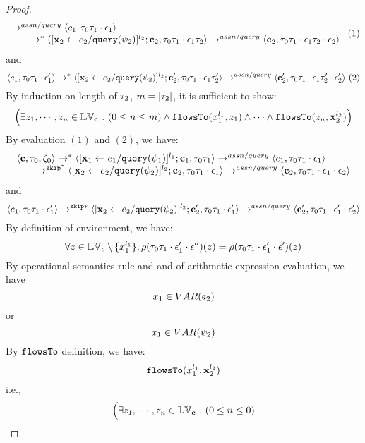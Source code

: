 \begin{proof}
\[\begin{array}{l}
\rightarrow^{assn/query}
 \langle c_1, \mathtt{\tau}_0 \mathtt{\tau}_1 \cdot \mathtt{\epsilon}_1 \rangle \\
  \qquad \rightarrow^{*} 
  \langle [\mathrel{ {\boldsymbol{\mathbf{x}}}_2 \leftarrow e_2 / {\tt query}(\psi_2) }]^{l_2};{\boldsymbol{\mathbf{c}}}_2, 
  \mathtt{\tau}_0 \mathtt{\tau}_1 \cdot \mathtt{\epsilon}_1 \mathtt{\tau}_2 \rangle 
  \rightarrow^{assn/query} 
  \langle {\boldsymbol{\mathbf{c}}}_2,  \mathtt{\tau}_0 \mathtt{\tau}_1 \cdot \mathtt{\epsilon}_1 \mathtt{\tau}_2 \cdot \mathtt{\epsilon}_2 \rangle 
\end{array} ~ (1)
 \]
 and 
  \[
  \langle c_1, \mathtt{\tau}_0 \mathtt{\tau}_1 \cdot \mathtt{\epsilon}_1' \rangle 
  \rightarrow^{*} 
  \langle [\mathrel{ {\boldsymbol{\mathbf{x}}}_2 \leftarrow e_2 / {\tt query}(\psi_2) }]^{l_2} ; {\boldsymbol{\mathbf{c}}}_2', \mathtt{\tau}_0 \mathtt{\tau}_1 \cdot \mathtt{\epsilon}_1 \mathtt{\tau}_2' \rangle 
  \rightarrow^{assn/query} 
  \langle {\boldsymbol{\mathbf{c}}}_2',  \mathtt{\tau}_0 \mathtt{\tau}_1 \cdot \mathtt{\epsilon}_1 \mathtt{\tau}_2' \cdot \mathtt{\epsilon}_2' \rangle 
 ~(2)
 \]
%
By induction on length of $\mathtt{\tau}_2$, $m = |\mathtt{\tau}_2|$, it is sufficient to show:
%
 \[
 \Big( \exists z_1, \cdots, z_n \in \mathbb{LV}_{{\boldsymbol{\mathbf{c}}}} ~.~ (0 \leq n \leq m )
 \land \mathtt{flowsTo}(x_1^{l_1}, z_1) \land \cdots \land \mathtt{flowsTo}(z_n, {\boldsymbol{\mathbf{x}}}_2^{l_2}) \Big)
  \]
 By evaluation $(1)$ and $(2)$, we have:
\[
  \begin{array}{l}   
\langle {\boldsymbol{\mathbf{c}}}, \mathtt{\tau}_0, \mathtt{\zeta}_0 \rangle \rightarrow^{*} 
\langle [\mathrel{ {\boldsymbol{\mathbf{x}}}_1 \leftarrow e_1 / {\tt query}(\psi_1) }]^{l_1} ; {\boldsymbol{\mathbf{c}}}_1, \mathtt{\tau}_0 \mathtt{\tau}_1 \rangle  \rightarrow^{assn/query}
 \langle c_1, \mathtt{\tau}_0 \mathtt{\tau}_1 \cdot \mathtt{\epsilon}_1 \rangle \\
  \qquad \rightarrow^{\mathtt{skip}^*} 
  \langle [\mathrel{ {\boldsymbol{\mathbf{x}}}_2 \leftarrow e_2 / {\tt query}(\psi_2) }]^{l_2};{\boldsymbol{\mathbf{c}}}_2, 
  \mathtt{\tau}_0 \mathtt{\tau}_1 \cdot \mathtt{\epsilon}_1 \rangle 
  \rightarrow^{assn/query} 
  \langle {\boldsymbol{\mathbf{c}}}_2,  \mathtt{\tau}_0 \mathtt{\tau}_1 \cdot \mathtt{\epsilon}_1 \cdot \mathtt{\epsilon}_2 \rangle 
\end{array}
 \]
 and 
  \[
  \langle c_1, \mathtt{\tau}_0 \mathtt{\tau}_1 \cdot \mathtt{\epsilon}_1' \rangle 
  \rightarrow^{\mathtt{skip}*} 
  \langle [\mathrel{ {\boldsymbol{\mathbf{x}}}_2 \leftarrow e_2 / {\tt query}(\psi_2) }]^{l_2} ; {\boldsymbol{\mathbf{c}}}_2', \mathtt{\tau}_0 \mathtt{\tau}_1 \cdot \mathtt{\epsilon}_1' \rangle 
  \rightarrow^{assn/query} 
  \langle {\boldsymbol{\mathbf{c}}}_2',  \mathtt{\tau}_0 \mathtt{\tau}_1 \cdot \mathtt{\epsilon}_1' \cdot \mathtt{\epsilon}_2' \rangle 
 \]
%
By definition of environment, we have:
\[
  \forall z \in \mathbb{LV}_c \setminus \{x_1^{l_1}\} ,
  \rho(\mathtt{\tau}_0 \mathtt{\tau}_1 \cdot \mathtt{\epsilon}_1' \cdot \mathtt{\epsilon}'') (z) =  
  \rho(\mathtt{\tau}_0 \mathtt{\tau}_1 \cdot \mathtt{\epsilon}_1' \cdot \mathtt{\epsilon}') (z)
\]
%
By operational semantics rule  and  and  of arithmetic expression evaluation, we have 
\[
  x_1 \in VAR(e_2)
\]
or
\[
  x_1 \in VAR(\psi_2)
\]
%
By $\mathtt{flowsTo}$ definition, we have:
%
\[
\mathtt{flowsTo}(x_1^{l_1}, {\boldsymbol{\mathbf{x}}}_2^{l_2})
\]
i.e.,
%
\[
 \Big( \exists z_1, \cdots, z_n \in \mathbb{LV}_{{\boldsymbol{\mathbf{c}}}} ~.~ (0 \leq n \leq 0 )
\]
\end{proof}
